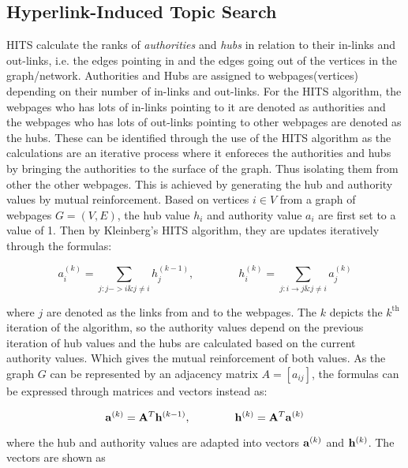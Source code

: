 \subsection{Hyperlink-Induced Topic Search}
HITS calculate the ranks of \emph{authorities} and \emph{hubs} in relation to their in-links and out-links\cite{langville2005survey}, i.e. the edges pointing in and the edges going out of the vertices in the graph/network.  Authorities and Hubs are assigned to webpages(vertices) depending on their number of in-links and out-links. For the HITS algorithm, the webpages who has lots of in-links pointing to it are denoted as authorities and the webpages who has lots of out-links pointing to other webpages are denoted as the hubs. These can be identified through the use of the HITS algorithm as the calculations are an iterative process where it enforeces the authorities and hubs by bringing the authorities to the surface of the graph. Thus isolating them from other the other webpages. This is achieved by generating the hub and authority values by mutual reinforcement. Based on vertices $i \in V$ from a graph of webpages $G = (V , E)$, the hub value $h_i$ and authority value $a_i$ are first set to a value of 1. Then by Kleinberg's HITS algorithm, they are updates iteratively through the formulas:

\begin{equation}
a_i^(k) = \sum_{j:j->i \& j \ne i}h_j^{(k-1)} , \qquad \qquad h_i^(k) = \sum_{j:i \rightarrow j \& j \ne i}a_j^{(k)}
\end{equation}

where $j$ are denoted as the links from and to the webpages. The $k$ depicts the $k^{\text{th}}$ iteration of the algorithm, so the authority values depend on the previous iteration of hub values and the hubs are calculated based on the current authority values. Which gives the mutual reinforcement of both values. As the graph $G$ can be represented by an adjacency matrix $A = [a_{ij}]$, the formulas can be expressed through matrices\cite{chatzigeorgiou2006application} and vectors instead as:

\begin{equation}
\bold{a}^{(k)} = \bold{A}^{T}\bold{h}^{(k-1)} , \qquad \qquad \bold{h}^{(k)} = \bold{A}^{T}\bold{a}^{(k)}
\end{equation}

where the hub and authority values are adapted into vectors $\bold{a}^{(k)}$ and $\bold{h}^{(k)}$. The vectors are shown as

